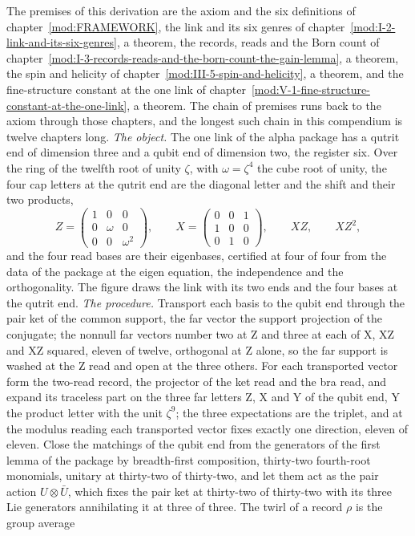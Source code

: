 \begin{chproof}
The premises of this derivation are the axiom and the six definitions of chapter~\ref{mod:FRAMEWORK}, the link and its six genres of chapter~\ref{mod:I-2-link-and-its-six-genres}, a theorem, the records, reads and the Born count of chapter~\ref{mod:I-3-records-reads-and-the-born-count-the-gain-lemma}, a theorem, the spin and helicity of chapter~\ref{mod:III-5-spin-and-helicity}, a theorem, and the fine-structure constant at the one link of chapter~\ref{mod:V-1-fine-structure-constant-at-the-one-link}, a theorem. The chain of premises runs back to the axiom through those chapters, and the longest such chain in this compendium is twelve chapters long.
\textit{The object.} The one link of the alpha package has a qutrit end of dimension three and a qubit end of dimension two, the register six. Over the ring of the twelfth root of unity $\zeta$, with $\omega = \zeta^{4}$ the cube root of unity, the four cap letters at the qutrit end are the diagonal letter and the shift and their two products,
\begin{equation} Z = \begin{pmatrix} 1 & 0 & 0 \\ 0 & \omega & 0 \\ 0 & 0 & \omega^{2} \end{pmatrix}, \qquad X = \begin{pmatrix} 0 & 0 & 1 \\ 1 & 0 & 0 \\ 0 & 1 & 0 \end{pmatrix}, \qquad XZ, \qquad XZ^{2}, \end{equation}
and the four read bases are their eigenbases, certified at four of four from the data of the package at the eigen equation, the independence and the orthogonality. The figure draws the link with its two ends and the four bases at the qutrit end.
\textit{The procedure.} Transport each basis to the qubit end through the pair ket of the common support, the far vector the support projection of the conjugate; the nonnull far vectors number two at Z and three at each of X, XZ and XZ squared, eleven of twelve, orthogonal at Z alone, so the far support is washed at the Z read and open at the three others. For each transported vector form the two-read record, the projector of the ket read and the bra read, and expand its traceless part on the three far letters Z, X and Y of the qubit end, Y the product letter with the unit $\zeta^{9}$; the three expectations are the triplet, and at the modulus reading each transported vector fixes exactly one direction, eleven of eleven. Close the matchings of the qubit end from the generators of the first lemma of the package by breadth-first composition, thirty-two fourth-root monomials, unitary at thirty-two of thirty-two, and let them act as the pair action $U \otimes \bar U$, which fixes the pair ket at thirty-two of thirty-two with its three Lie generators annihilating it at three of three. The twirl of a record $\rho$ is the group average

\end{chproof}
